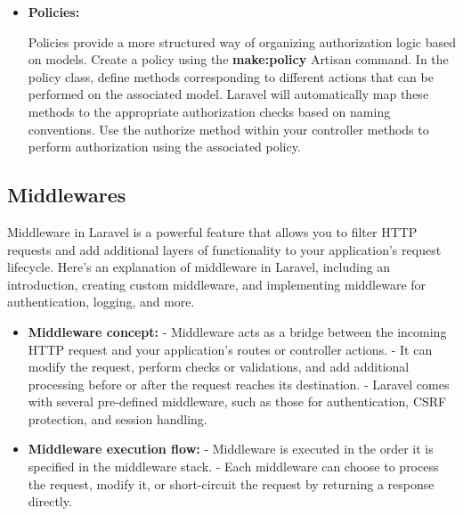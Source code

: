 \begin{itemize}
\begin{itemize}
        \item \textbf{Policies:} 
        
        Policies provide a more structured way of organizing authorization logic based on models.
        Create a policy using the \textbf{make:policy} Artisan command.
        In the policy class, define methods corresponding to different actions that can be performed on the associated model.
        Laravel will automatically map these methods to the appropriate authorization checks based on naming conventions.
        Use the authorize method within your controller methods to perform authorization using the associated policy.
    \end{itemize}
\end{itemize}    
\subsection{Middlewares}
Middleware in Laravel is a powerful feature that allows you to filter HTTP requests and add additional layers of functionality to your application's request lifecycle. Here's an explanation of middleware in Laravel, including an introduction, creating custom middleware, and implementing middleware for authentication, logging, and more.
\begin{itemize}
    \item \textbf{Middleware concept:}
   - Middleware acts as a bridge between the incoming HTTP request and your application's routes or controller actions.
   - It can modify the request, perform checks or validations, and add additional processing before or after the request reaches its destination.
   - Laravel comes with several pre-defined middleware, such as those for authentication, CSRF protection, and session handling.

   \item \textbf{Middleware execution flow:}
   - Middleware is executed in the order it is specified in the middleware stack.
   - Each middleware can choose to process the request, modify it, or short-circuit the request by returning a response directly.

\end{itemize}  

